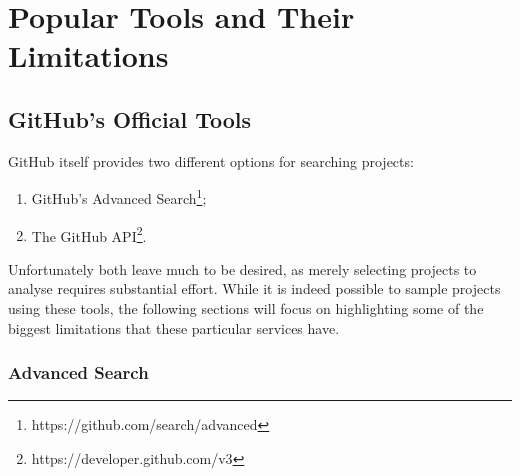 \chapter{Popular Tools and Their Limitations}

\section{GitHub's Official Tools}

GitHub itself provides two different options for searching projects:
\begin{enumerate}
    \item GitHub's Advanced Search\footnote{https://github.com/search/advanced};
    \item The GitHub API\footnote{https://developer.github.com/v3}\@.
\end{enumerate}
Unfortunately both leave much to be desired, as merely selecting projects to analyse requires substantial effort.
While it is indeed possible to sample projects using these tools, the following sections will focus on highlighting some of the biggest limitations that these particular services have.

\subsection{Advanced Search}

